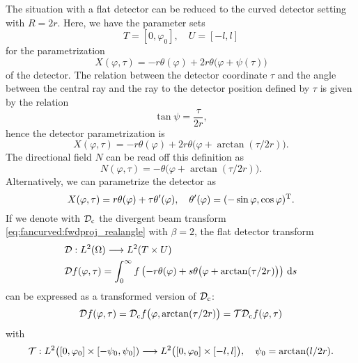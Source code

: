 \documentclass{amsart}
\renewcommand*{\phi}{\varphi}
\begin{document}
The situation with a flat detector can be reduced to the curved detector setting with $R = 2r$. Here, we have the parameter sets
%
\begin{equation}
 \label{eq:fanflat:params}
 T = [0, \phi_0], \quad U = [-l, l]
\end{equation}
%
for the parametrization
%
\begin{equation*}
 X(\phi, \tau) = - r \theta(\phi) + 2 r \theta\big(\phi + \psi(\tau)\big)
\end{equation*}
%
of the detector. The relation between the detector coordinate $\tau$ and the angle between the central ray and the ray to the detector 
position defined by $\tau$ is given by the relation
%
\begin{equation*}
 \tan\psi = \frac{\tau}{2r},
\end{equation*}
%
hence the detector parametrization is
%
\begin{equation}
 \label{eq:fanflat:detector_parametr}
 X(\phi, \tau) = - r \theta(\phi) + 2 r \theta\big(\phi + \arctan(\tau/2r)\big).
\end{equation}
%
The directional field $N$ can be read off this definition as
%
\begin{equation}
 \label{eq:fanflat:dirfield}
 N(\phi, \tau) = -\theta\big(\phi + \arctan(\tau/2r)\big).
\end{equation} 
%
Alternatively, we can parametrize the detector as
%
\begin{equation}
 \label{eq:fanflat:detector_parametr_alt}
 X(\phi, \tau) = r \theta(\phi) + \tau \theta'(\phi),\quad \theta'(\phi) = \TRANSP{(-\sin\phi, \cos\phi)}.
\end{equation}
%
If we denote with ${\mathcal{D}}_{\mathrm{c}}$ the divergent beam transform \eqref{eq:fancurved:fwdproj_realangle} with $\beta=2$, the flat detector 
transform
%
\begin{align}
 &\OPD: L^2(\Omega) \Lto L^2(T \times U) \notag \\
 \label{eq:fanflat:fwdproj}
 &\OPD f(\phi, \tau) = \int_0^\infty f\left(-r \theta(\phi) + s \theta\big(\phi + \arctan(\tau/2r)\big) \right)\, \D s
\end{align}
%
can be expressed as a transformed version of ${\mathcal{D}}_{\mathrm{c}}$:
%
\begin{equation*}
 \OPD f(\phi, \tau) = \OPD_{\mathrm{c}} f\big(\phi,  \arctan(\tau/2r)\big) = \OPT \OPD_{\mathrm{c}} f(\phi, \tau)
\end{equation*}
%
with
%
\begin{equation*}
 \OPT: L^2\big([0, \phi_0] \times [-\psi_0, \psi_0]) \Lto L^2\big([0, \phi_0] \times [-l, l]\big), \quad \psi_0 = \arctan(l/2r).
\end{equation*}
\end{document}
